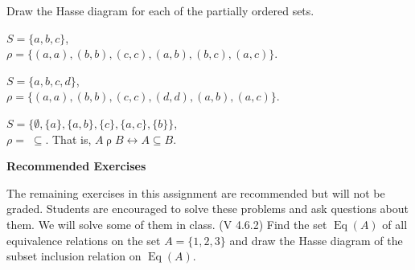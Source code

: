 \documentclass[fleqn,addpoints,12pt]{exam}
\newif\ifanswers
\theoremstyle{remark}
\newcommand{\Eq}{\ensuremath{\operatorname{Eq}}}
\newcommand{\mr}[1]{\ensuremath{\mathrel{#1}}}
\newcommand{\lra}{\ensuremath{\leftrightarrow}}
\begin{document}
\begin{questions}
  \medskip
  \begin{solution}  \end{solution}
  \ifanswers \vskip1cm \else \newpage \fi



  \question[3] %
  Draw the Hasse diagram for each of the partially ordered sets.
  \begin{parts}
  \item $S = \{a, b, c\}$,\\
    $\rho = \{ (a,a), (b,b), (c,c), (a,b), (b,c), (a,c)\}$.
  \item $S = \{a, b, c, d\}$,\\
    $\rho = \{ (a,a), (b,b), (c,c), (d,d), (a,b), (a,c)\}$.
  \item $S = \{\emptyset, \{a\}, \{a, b\}, \{c\}, \{a, c\}, \{b\}\}$, \\
    $\rho = \; \subseteq$.  That is,
    $A \mr{\rho} B \lra A\subseteq B$.
  \end{parts}
  \medskip
  \begin{solution}
  \end{solution}
  \ifanswers \vskip1cm \else \newpage \fi

\thispagestyle{empty}
\begin{center}
{\bf Recommended Exercises}
\end{center}
The remaining exercises in this assignment are recommended but will not be
graded.  Students are encouraged to solve these problems and ask questions
about them.  We will solve some of them in class.
  \question (V 4.6.2)
  Find the set $\Eq(A)$ of all equivalence relations on the 
  set $A = \{1, 2, 3\}$ and draw the Hasse diagram of the subset 
  inclusion relation on $\Eq(A)$.
  \medskip
  \begin{solution}  \end{solution}


\end{questions}
\end{document}
